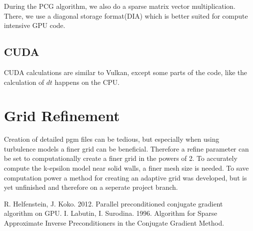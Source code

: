 \documentclass{article}
\begin{document}
During the PCG algorithm, we also do a sparse matrix vector multiplication. There, we use a diagonal storage format(DIA) which is better suited for compute intensive GPU code.
\subsection{CUDA}

CUDA calculations are similar to Vulkan, except some parts of the code, like the calculation of $dt$ happens on the CPU.

\section{Grid Refinement}
Creation of detailed pgm files can be tedious, but especially when using turbulence models a finer grid can be beneficial. Therefore a refine parameter can be set to computationally create a finer grid in the powers of 2.
To accurately compute the k-epsilon model near solid walls, a finer mesh size is needed. To save computation power a method for creating an adaptive grid was developed, but is yet unfinished  and therefore on a seperate project branch.


\begin{thebibliography}{6}
R. Helfenstein, J. Koko. 2012. Parallel preconditioned conjugate gradient algorithm on GPU.
I. Labutin, I. Surodina. 1996. Algorithm for Sparse Approximate Inverse Preconditioners in the Conjugate Gradient Method.

\end{thebibliography}
\end{document}
